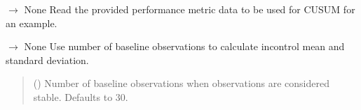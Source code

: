 \documentclass[letterpaper,10pt,oneside,english]{sphinxmanual}
\begin{document}
\begin{fulllineitems}
\begin{fulllineitems}
\begin{quote}
\begin{description}
\end{description}\end{quote}

\end{fulllineitems}


\begin{fulllineitems}
\label{\detokenize{ref_cusum:package.cusum.CUSUM.set_df_metric_default}}
\pysigstartsignatures
\pysiglinewithargsret
{}
{}
{{ $\rightarrow$ None}}
\pysigstopsignatures
\sphinxAtStartPar
Read the provided performance metric data to be used for CUSUM for an example.

\end{fulllineitems}


\begin{fulllineitems}
\label{\detokenize{ref_cusum:package.cusum.CUSUM.set_init_stats}}
\pysigstartsignatures
\pysiglinewithargsret
{}
{}
{{ $\rightarrow$ None}}
\pysigstopsignatures
\sphinxAtStartPar
Use number of baseline observations to calculate in\sphinxhyphen{}control mean and standard deviation.
\begin{quote}\begin{description}
\sphinxAtStartPar
{} (\sphinxstyleliteralemphasis{\sphinxupquote{, }}) \textendash{} Number of baseline observations when observations are considered stable. Defaults to 30.

\end{description}\end{quote}

\end{fulllineitems}



\end{fulllineitems}
\end{document}
